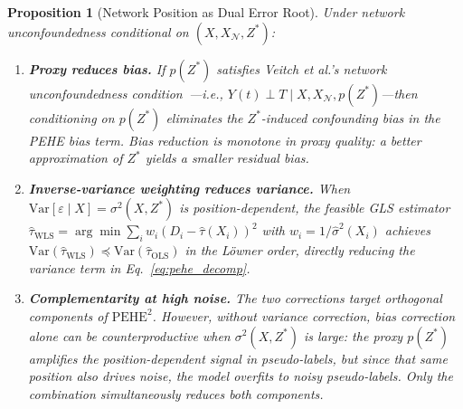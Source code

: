 \documentclass[sigconf,anonymous,review]{acmart}
\newtheorem{proposition}{Proposition}
\begin{document}
\begin{proposition}[Network Position as Dual Error Root]\label{prop:dualroot}
Under network unconfoundedness conditional on $(X, X_{\mathcal{N}}, Z^*)$:
\begin{enumerate}[label=(\alph*)]
    \item \textbf{Proxy reduces bias.} If $p(Z^*)$ satisfies Veitch et al.'s network unconfoundedness condition~\cite{veitch2019using}---i.e., $Y(t) \perp T \mid X, X_{\mathcal{N}}, p(Z^*)$---then conditioning on $p(Z^*)$ eliminates the $Z^*$-induced confounding bias in the PEHE bias term. Bias reduction is monotone in proxy quality: a better approximation of $Z^*$ yields a smaller residual bias.

    \item \textbf{Inverse-variance weighting reduces variance.} When $\mathrm{Var}[\varepsilon \mid X] = \sigma^2(X, Z^*)$ is position-dependent, the feasible GLS estimator $\hat{\tau}_{\mathrm{WLS}} = \arg\min \sum_i w_i (D_i - \hat{\tau}(X_i))^2$ with $w_i = 1/\hat{\sigma}^2(X_i)$ achieves $\mathrm{Var}(\hat{\tau}_{\mathrm{WLS}}) \preceq \mathrm{Var}(\hat{\tau}_{\mathrm{OLS}})$ in the Löwner order, directly reducing the variance term in Eq.~\ref{eq:pehe_decomp}.

    \item \textbf{Complementarity at high noise.} The two corrections target orthogonal components of $\mathrm{PEHE}^2$. However, without variance correction, bias correction alone can be counterproductive when $\sigma^2(X, Z^*)$ is large: the proxy $p(Z^*)$ amplifies the position-dependent signal in pseudo-labels, but since that same position also drives noise, the model overfits to noisy pseudo-labels. Only the combination simultaneously reduces both components.
\end{enumerate}
\end{proposition}
\end{document}
